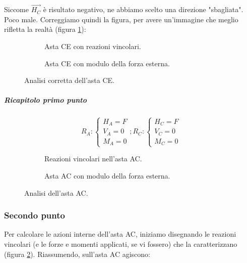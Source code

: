 \documentclass[main.tex]{subfiles}
\begin{document}
Siccome $\vec{H_C}$ è risultato negativo, ne abbiamo scelto una direzione "sbagliata". Poco male. Correggiamo quindi la figura, per avere un'immagine che meglio rifletta la realtà (figura \ref{vincoli_asta_CE_2}):


\begin{figure}[!tbp]
  \begin{subfigure}[b]{.5\textwidth}
  \centering
  \resizebox{.5\textwidth}{!}{}
  \caption{Asta CE con reazioni vincolari.}
  \end{subfigure}
  \hfill
  \begin{subfigure}[b]{.5\textwidth}
  \centering
  \resizebox{.5\textwidth}{!}{}
  \caption{Asta CE con modulo della forza esterna.}
  \end{subfigure}
  \caption{Analisi corretta dell'asta CE.}
  \label{vincoli_asta_CE_2}
\end{figure}
\subparagraph{Ricapitolo primo punto}

\[
R_A : \begin{cases}
H_A = F\\
V_A = 0\\
M_A = 0
\end{cases}
;
R_C : \begin{cases}
H_C = F\\
V_C = 0\\
M_C = 0
\end{cases}
\]

\begin{figure}[!tbp]
  \begin{subfigure}[b]{.5\textwidth}
  \centering
  \resizebox{.5\textwidth}{!}{}
  \caption{Reazioni vincolari nell'asta AC.}
  \end{subfigure}
  \hfill
  \begin{subfigure}[b]{.5\textwidth}
  \centering
  \resizebox{.5\textwidth}{!}{}
  \caption{Asta AC con modulo della forza esterna.}
  \end{subfigure}
  \caption{Analisi dell'asta AC.}
  \label{vincoli_asta_AC_1}
\end{figure}

\subsubsection{Secondo punto}
Per calcolare le azioni interne dell'asta AC, iniziamo disegnando le reazioni vincolari (e le forze e momenti applicati, se vi fossero) che la caratterizzano (figura \ref{vincoli_asta_AC_1}). Riassumendo, sull'asta AC agiscono:
\end{document}
